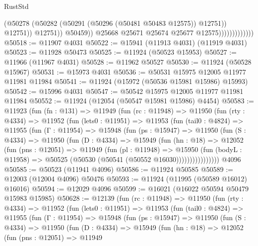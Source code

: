 \begin{lexlean}{RustStd}
\begin{coremodule}
{\begin{coremodule}
{{{{{{{{{{{{{{{{{{{{{{{{{{{{{{{{{{{{{{{{{{{{{{{{{{{{{{{{{{{{{{{{{{{{{{{{{{{{{{{{                                        (@50278
                                          (@50282 (@50291 (@50296 (@50481 @50483 @12575)) @12751))
                                          @12751))
                                      @12751))
                                  @50459))
                              @25668
                              @25671
                              @25674
                              @25677
                              @12575)))))))))))))
@50518 := @11907 @4031
@50522 := @15941 (@11913 @4031) (@11919 @4031)
@50523 := @11928 @50473
@50525 := @11924 (@50523 @15953)
@50527 := @11966 (@11967 @4031)
@50528 := @11962 @50527
@50530 := @11924 (@50528 @15967)
@50531 := @15973 @4031
@50536 := @50531 @15975 @12005 @11977 @11981 @11984
@50541 := @11924 (@15972 (@50536 @15981 @15986) @15993)
@50542 := @15996 @4031
@50547 := @50542 @15975 @12005 @11977 @11981 @11984
@50552 := @11924 (@12054 (@50547 @15981 @15986) @4454)
@50583 := @11923
    (fun (fn : @131) =>
    @11949
      (fun (rc : @11948) =>
      @11950
        (fun (rty : @4334) =>
        @11952
          (fun (lets0 : @11951) =>
          @11953
            (fun (tail0 : @4824) =>
            @11955
              (fun (Γ : @11954) =>
              @15948
                (fun (ps : @15947) =>
                @11950
                  (fun (S : @4334) =>
                  @11950
                    (fun (D : @4334) =>
                    @15949
                      (fun (hn : @18) =>
                      @12052
                        (fun (pns : @12051) =>
                        @11949
                          (fun (pl : @11948) =>
                          @15950
                            (fun (bodyL : @11958) =>
                            @50525 (@50530 (@50541 (@50552 @16030))))))))))))))))
    @4096
@50585 := @50523 (@11941 @4096)
@50586 := @11924 @50585
@50589 := @12003 (@12004 @4096) @50476
@50593 := @11924 (@11995 (@50589 @16012) @16016)
@50594 := @12029 @4096
@50599 := @16021 (@16022 @50594 @50479 @15983 @15985)
@50628 := @12139
    (fun (rc : @11948) =>
    @11950
      (fun (rty : @4334) =>
      @11952
        (fun (lets0 : @11951) =>
        @11953
          (fun (tail0 : @4824) =>
          @11955
            (fun (Γ : @11954) =>
            @15948
              (fun (ps : @15947) =>
              @11950
                (fun (S : @4334) =>
                @11950
                  (fun (D : @4334) =>
                  @15949
                    (fun (hn : @18) =>
                    @12052
                      (fun (pns : @12051) =>
                      @11949
}}}}}}}}}}}}}}}}}}}}}}}}}}}}}}}}}}}}}}}}}}}}}}}}}}}}}}}}}}}}}}}}}}}}}}}}}}}}}}}}
\end{coremodule}}
\end{coremodule}
\end{lexlean}

